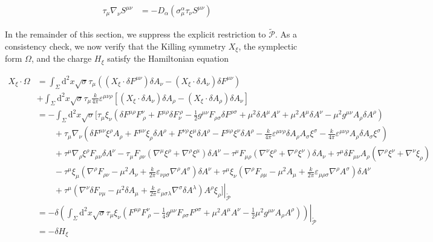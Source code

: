 \begin{align}
\tau _{\mu}\nabla _{\nu}S^{\mu \nu} & =-D_{\alpha}(\sigma ^{\alpha}_{\mu}\tau _{\nu}S^{\mu \nu})
\end{align}

In the remainder of this section, we suppress the explicit restriction to $\widetilde{\mathcal{P}}$. As a consistency check, we now verify that the Killing symmetry $X_{\xi}$, the symplectic form $\Omega$, and the charge $H_{\xi}$ satisfy the Hamiltonian equation

\begin{align}
X_{\xi}\cdot \Omega & =\int _{\Sigma}\mathrm{d}^{2}x\sqrt{ \sigma }\tau _{\mu}\left((X_{\xi}\cdot \delta F^{\mu \nu})\delta A_{\nu}-(X_{\xi}\cdot \delta A_{\nu})\delta F^{\mu \nu}\right) \\
 & +\int _{\Sigma}\mathrm{d}^{2}x\sqrt{ \sigma }\tau _{\mu} \frac{k}{4\pi}\varepsilon ^{\mu \nu \rho}[(X_{\xi}\cdot \delta A_{\nu})\delta A_{\rho}-(X_{\xi}\cdot \delta A_{\rho})\delta A_{\nu}] \\
 & =-\int _{\Sigma}\mathrm{d}^{2}x\sqrt{ \sigma } \Bigg[\tau _{\mu}\xi _{\nu}\left(\delta F^{\mu \rho}F^{\nu}_{~\rho}+F^{\mu \rho}\delta F_{\nu}^{~\rho}-\frac{1}{2}g^{\mu \nu}F_{\rho \sigma}\delta F^{\rho \sigma}+\mu ^{2}\delta A^{\mu}A^{\nu}+\mu ^{2}A^{\mu}\delta A^{\nu}-\mu ^{2}g^{\mu \nu}A_{\rho}\delta A^{\rho}\right) \\
 & \qquad +\tau _{\mu}\nabla _{\nu}\left(\delta F^{\mu \nu}\xi ^{\rho}A_{\rho}+F^{\mu \nu}\xi _{\rho}\delta A^{\rho}+F^{\nu \rho}\xi ^{\mu}\delta A^{\rho}-F^{\mu \rho}\xi ^{\nu}\delta A^{\rho}-\frac{k}{4\pi}\varepsilon ^{\mu \nu \rho}\delta A_{\rho}A_{\sigma}\xi ^{\sigma}-\frac{k}{4\pi}\varepsilon ^{\mu \nu \rho}A_{\rho}\delta A_{\sigma}\xi ^{\sigma}\right) \\
 & \qquad +\tau ^{\mu}\nabla _{\rho}\xi ^{\rho}F_{\mu \nu}\delta A^{\nu}-\tau _{\mu}F_{\rho \nu}(\nabla ^{\mu}\xi ^{\rho}+\nabla ^{\rho}\xi ^{\mu})\delta A^{\nu}-\tau ^{\mu}F_{\mu \rho}(\nabla ^{\nu}\xi ^{\rho}+\nabla ^{\rho}\xi ^{\nu})\delta A_{\nu}+\tau ^{\mu}\delta F_{\mu \nu}A_{\rho}(\nabla ^{\rho}\xi ^{\nu}+\nabla ^{\nu}\xi _{\rho}) \\
 & \qquad -\tau ^{\mu}\xi _{\mu}\left( \nabla ^{\rho}F_{\rho \nu}-\mu ^{2}A_{\nu}+\frac{k}{2\pi}\varepsilon _{\nu \rho \sigma}\nabla ^{\rho}A^{\sigma} \right)\delta A^{\nu}+\tau ^{\mu}\xi _{\nu}\left( \nabla ^{\rho}F_{\rho \mu}-\mu ^{2}A_{\mu}+\frac{k}{2\pi}\varepsilon _{\mu \rho \sigma}\nabla ^{\rho}A^{\sigma} \right)\delta A^{\nu} \\
 & \qquad +\left.\tau ^{\mu}\left( \nabla ^{\nu}\delta F_{\nu \mu}-\mu ^{2}\delta A_{\mu}+\frac{k}{2\pi}\varepsilon _{\mu \sigma \lambda}\nabla ^{\sigma}\delta A^{\lambda} \right)A^{\rho}\xi _{\rho} \Bigg]\right|_{\widetilde{\mathcal{P}}} \\
 & =-\left.\delta \left( \int _{\Sigma}\mathrm{d}^{2}x\sqrt{ \sigma }\tau _{\mu}\xi _{\nu}\left(F^{\mu \rho}F^{\nu}_{~\rho}-\frac{1}{4}g^{\mu \nu}F_{\rho \sigma}F^{\rho \sigma}+\mu ^{2}A^{\mu}A^{\nu}-\frac{1}{2}\mu ^{2}g^{\mu \nu}A_{\rho}A^{\rho}\right) \right)\right|_{\widetilde{\mathcal{P}}} \\
 & =-\delta H_{\xi}
\end{align}

